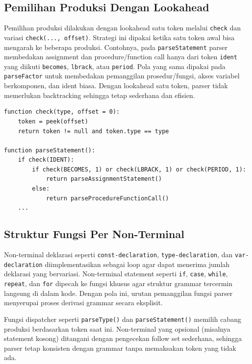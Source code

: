 \subsection{Pemilihan Produksi Dengan Lookahead}
Pemilihan produksi dilakukan dengan lookahead satu token melalui \texttt{check} dan variasi \texttt{check(..., offset)}. Strategi ini dipakai ketika satu token awal bisa mengarah ke beberapa produksi. Contohnya, pada \texttt{parseStatement} parser membedakan assignment dan procedure/function call hanya dari token \texttt{ident} yang diikuti \texttt{becomes}, \texttt{lbrack}, atau \texttt{period}. Pola yang sama dipakai pada \texttt{parseFactor} untuk membedakan pemanggilan prosedur/fungsi, akses variabel berkomponen, dan ident biasa. Dengan lookahead satu token, parser tidak memerlukan backtracking sehingga tetap sederhana dan efisien.

\begin{tcolorbox}[title=Pseudocode lookahead,colback=gray!5,colframe=black!60,boxrule=0.5pt,arc=2mm,breakable]
\begin{verbatim}
function check(type, offset = 0):
    token = peek(offset)
    return token != null and token.type == type

function parseStatement():
    if check(IDENT):
        if check(BECOMES, 1) or check(LBRACK, 1) or check(PERIOD, 1):
            return parseAssignmentStatement()
        else:
            return parseProcedureFunctionCall()
    ...
\end{verbatim}
\end{tcolorbox}

\subsection{Struktur Fungsi Per Non-Terminal}
Non-terminal deklarasi seperti 
\texttt{const-declaration}, 
\texttt{type-declaration}, dan \texttt{var-declaration} diimplementasikan 
sebagai loop agar dapat menerima jumlah deklarasi yang bervariasi. 
Non-terminal statement seperti \texttt{if}, \texttt{case}, \texttt{while}, 
\texttt{repeat}, dan \texttt{for} dipecah ke fungsi khusus agar struktur 
grammar tercermin langsung di dalam kode. Dengan pola ini, urutan pemanggilan 
fungsi parser menyerupai proses derivasi grammar secara eksplisit.

Fungsi dispatcher seperti \texttt{parseType()} dan \texttt{parseStatement()} memilih cabang produksi berdasarkan token saat ini. Non-terminal yang opsional (misalnya statement kosong) ditangani dengan pengecekan follow set sederhana, sehingga parser tetap konsisten dengan grammar tanpa memaksakan token yang tidak ada.

